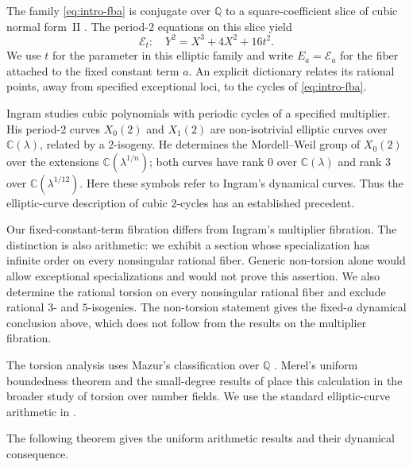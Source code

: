 \documentclass[11pt,a4paper]{amsart}
\theoremstyle{definition}
\theoremstyle{remark}
\numberwithin{equation}{section}
\newcommand{\Q}{\mathbb{Q}}
\newcommand{\mathcalE}{\mathcal{E}}
\begin{document}
The family \eqref{eq:intro-fba} is conjugate over $\Q$ to a
square-coefficient slice of cubic normal form~II
\cite[Definition~4.1 and Proposition~4.2]{benedetto2009computing}.
The period-$2$ equations on this slice yield
\[
\mathcalE_t:\quad Y^2=X^3+4X^2+16t^2.
\]
We use $t$ for the parameter in this elliptic family and write
$E_a=\mathcalE_a$ for the fiber attached to the fixed constant term $a$.
An explicit dictionary relates its rational points, away from specified
exceptional loci, to the cycles of \eqref{eq:intro-fba}.

Ingram \cite[Section~4]{ingram2012cubic} studies cubic polynomials with
periodic cycles of a specified multiplier. His period-$2$ curves
$X_0(2)$ and $X_1(2)$ are non-isotrivial elliptic curves over
$\mathbb C(\lambda)$, related by a $2$-isogeny. He determines the
Mordell--Weil group of $X_0(2)$ over the extensions
$\mathbb C(\lambda^{1/n})$; both curves have rank $0$ over
$\mathbb C(\lambda)$ and rank $3$ over
$\mathbb C(\lambda^{1/12})$. Here these symbols refer to Ingram's
dynamical curves. Thus the elliptic-curve description of cubic
$2$-cycles has an established precedent.

Our fixed-constant-term fibration differs from Ingram's multiplier
fibration. The distinction is also arithmetic: we exhibit a section
whose specialization has infinite order on every nonsingular rational
fiber. Generic non-torsion alone would allow exceptional specializations
and would not prove this assertion. We also determine the rational
torsion on every nonsingular rational fiber and exclude rational $3$- and $5$-isogenies.
The non-torsion statement gives the fixed-$a$ dynamical conclusion above,
which does not follow from the results on the multiplier fibration.

The torsion analysis uses Mazur's classification over $\Q$
\cite{mazur1977modular,mazur1978rational}. Merel's uniform boundedness
theorem \cite{merel1996bornes} and the small-degree results of
\cite{derickx2023torsion} place this calculation in the broader study of
torsion over number fields. We use the standard elliptic-curve
arithmetic in \cite{silverman2009arithmetic,washington2008elliptic}.

The following theorem gives the uniform arithmetic results and their
dynamical consequence.
\end{document}
